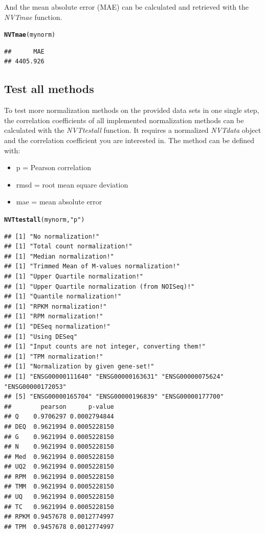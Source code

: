 \documentclass[11pt]{article}\usepackage[]{graphicx}\usepackage[usenames,dvipsnames]{color}
\makeatletter
\newcommand{\hlstr}[1]{\textcolor[rgb]{0.192,0.494,0.8}{#1}}%
\newcommand{\hlstd}[1]{\textcolor[rgb]{0.345,0.345,0.345}{#1}}%
\newcommand{\hlkwd}[1]{\textcolor[rgb]{0.737,0.353,0.396}{\textbf{#1}}}%
\newenvironment{kframe}{%
 \def\at@end@of@kframe{}%
 \ifinner\ifhmode%
  \def\at@end@of@kframe{\end{minipage}}%
  \begin{minipage}{\columnwidth}%
 \fi\fi%
 \def\FrameCommand##1{\hskip\@totalleftmargin \hskip-\fboxsep
 \colorbox{shadecolor}{##1}\hskip-\fboxsep
     \hskip-\linewidth \hskip-\@totalleftmargin \hskip\columnwidth}%
 \MakeFramed {\advance\hsize-\width
   \@totalleftmargin\z@ \linewidth\hsize
   \@setminipage}}%
 {\par\unskip\endMakeFramed%
 \at@end@of@kframe}
\newenvironment{knitrout}{}{} %
\makeatother
\begin{document}
And the mean absolute error (MAE) can be calculated and retrieved with the \textit{NVTmae} function.

\begin{knitrout}
\color{fgcolor}\begin{kframe}
\begin{alltt}
\hlkwd{NVTmae}\hlstd{(mynorm)}
\end{alltt}
\begin{verbatim}
##      MAE 
## 4405.926
\end{verbatim}
\end{kframe}
\end{knitrout}

\subsection{Test all methods}

To test more normalization methods on the provided data sets in one single step, the correlation coefficients of all implemented normalization methods can be calculated with the \textit{NVTtestall} function.
It requires a normalized \textit{NVTdata} object and the correlation coefficient you are interested in. The method can be defined with:

\begin{itemize}
 \item p = Pearson correlation
 \item rmsd = root mean square deviation
 \item mae = mean absolute error
\end{itemize}

\begin{knitrout}
\color{fgcolor}\begin{kframe}
\begin{alltt}
\hlkwd{NVTtestall}\hlstd{(mynorm,}\hlstr{"p"}\hlstd{)}
\end{alltt}
\begin{verbatim}
## [1] "No normalization!"
## [1] "Total count normalization!"
## [1] "Median normalization!"
## [1] "Trimmed Mean of M-values normalization!"
## [1] "Upper Quartile normalization!"
## [1] "Upper Quartile normalization (from NOISeq)!"
## [1] "Quantile normalization!"
## [1] "RPKM normalization!"
## [1] "RPM normalization!"
## [1] "DESeq normalization!"
## [1] "Using DESeq"
## [1] "Input counts are not integer, converting them!"
## [1] "TPM normalization!"
## [1] "Normalization by given gene-set!"
## [1] "ENSG00000111640" "ENSG00000163631" "ENSG00000075624" "ENSG00000172053"
## [5] "ENSG00000165704" "ENSG00000196839" "ENSG00000177700"
##        pearson      p-value
## Q    0.9706297 0.0002794844
## DEQ  0.9621994 0.0005228150
## G    0.9621994 0.0005228150
## N    0.9621994 0.0005228150
## Med  0.9621994 0.0005228150
## UQ2  0.9621994 0.0005228150
## RPM  0.9621994 0.0005228150
## TMM  0.9621994 0.0005228150
## UQ   0.9621994 0.0005228150
## TC   0.9621994 0.0005228150
## RPKM 0.9457678 0.0012774997
## TPM  0.9457678 0.0012774997
\end{verbatim}
\end{kframe}
\end{knitrout}
\end{document}
